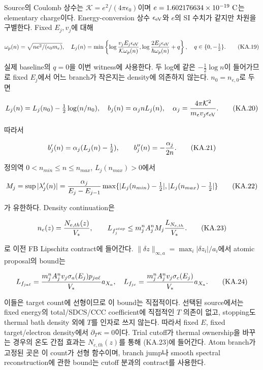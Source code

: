Source의 Coulomb 상수는 \(\mathcal K=e^2/(4\pi\epsilon_0)\)이며 \(e=1.602176634\times10^{-19}\ {\rm C}\)는 elementary charge이다. Energy-conversion 상수 \(\epsilon_{\rm eV}\)와 \(e\)의 SI 수치가 같지만 차원을 구별한다. Fixed \(E_j,v_j\)에 대해

\[
 \omega_p(n)=\sqrt{ne^2/(\epsilon_0m_e)},\quad
 L_j(n)=\min\left\{
 \log{v_jE_j\epsilon_{\rm eV}\over\mathcal K\omega_p(n)},
 \log{2E_j\epsilon_{\rm eV}\over\hbar\omega_p(n)}+q
 \right\},\quad q\in\{0,-\tfrac12\}.
 \tag{KA.19}
\]

실제 baseline의 \(q=0\)을 이번 witness에 사용한다. 두 log에 같은 \(-\frac12\log n\)이 들어가므로 fixed \(E_j\)에서 어느 branch가 작은지는 density에 의존하지 않는다. \(n_0=n_{e,0}\)로 두면

\[
 L_j(n)=L_j(n_0)-\tfrac12\log(n/n_0),\quad
 b_j(n)=\alpha_jnL_j(n),\quad
 \alpha_j={4\pi\mathcal K^2\over m_ev_j\epsilon_{\rm eV}}.
 \tag{KA.20}
\]

따라서

\[
 b'_j(n)=\alpha_j(L_j(n)-\tfrac12),\qquad
 b''_j(n)=-{\alpha_j\over2n}.
 \tag{KA.21}
\]

정의역 \(0<n_{min}\le n\le n_{max}\), \(L_j(n_{max})>0\)에서

\[
 M_j=\sup|\lambda'_j(n)|
 ={\alpha_j\over E_j-E_{j-1}}
 \max\{|L_j(n_{min})-\tfrac12|,|L_j(n_{max})-\tfrac12|\}
 \tag{KA.22}
\]

가 유한하다. Density continuation은

\[
 n_e(z)={N_{e,th}(z)\over V_*},\qquad
 L_{f_j^{stop}}\le m_j^n A_j^n M_j {L_{N_{e,th}}\over V_*}.
 \tag{KA.23}
\]

로 이전 FB Lipschitz contract에 들어간다. \(\|\delta z\|_{\infty,a}=\max_i|\delta z_i|/a_i\)에서 atomic proposal의 bound는

\[
 L_{f_{ja\ell}}={m_j^n A_j^n v_j\sigma_a(E_j)p_{ja\ell}\over V_*}a_{X_a},
 \quad
 L_{f_{jc}}={m_j^n A_j^n v_j\sigma_c(E_j)\over V_*}a_{X_a}.
 \tag{KA.24}
\]

이들은 target count에 선형이므로 이 bound는 직접적이다. 선택된 source에서는 fixed energy의 total/SDCS/CCC coefficient에 직접적인 \(T\) 의존이 없고, stopping도 thermal bath density 외에 \(T\)를 인자로 쓰지 않는다. 따라서 fixed \(E\), fixed target/electron density에서 \(\partial_T\kappa=0\)이다. Trial cutoff가 thermal ownership을 바꾸는 경우의 온도 간접 효과는 \(N_{e,th}(z)\)를 통해 (KA.23)에 들어간다. Atom branch가 고정된 곳은 이 count가 선형 함수이며, branch jump나 smooth spectral reconstruction에 관한 bound는 cutoff 분과의 contract를 사용한다.

